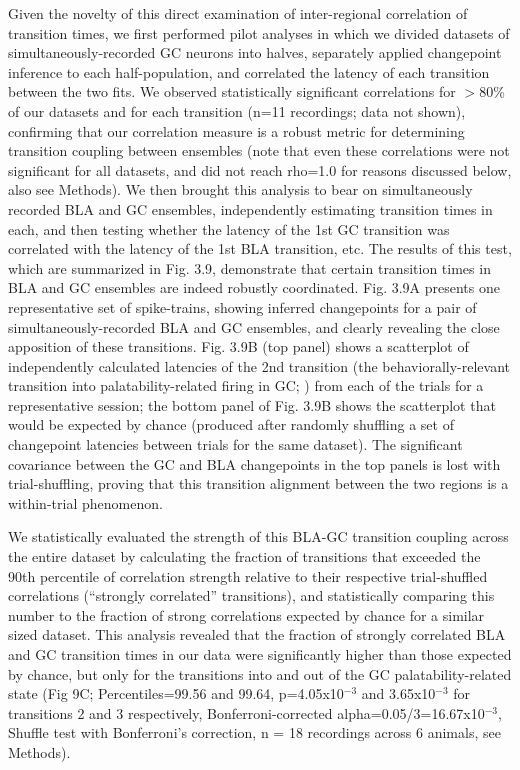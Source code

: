 \begin{refsection}
Given the novelty of this direct examination of inter-regional correlation of transition times, we first performed pilot analyses in which we divided datasets of simultaneously-recorded GC neurons into halves, separately applied changepoint inference to each half-population, and correlated the latency of each transition between the two fits. We observed statistically significant correlations for \(>\)80\% of our datasets and for each transition (n=11 recordings; data not shown), confirming that our correlation measure is a robust metric for determining transition coupling between ensembles (note that even these correlations were not significant for all datasets, and did not reach rho=1.0 for reasons discussed below, also see Methods). 
We then brought this analysis to bear on simultaneously recorded BLA and GC ensembles, independently estimating transition times in each, and then testing whether the latency of the 1st GC transition was correlated with the latency of the 1st BLA transition, etc. The results of this test, which are summarized in Fig. 3.9, demonstrate that certain transition times in BLA and GC ensembles are indeed robustly coordinated. Fig. 3.9A presents one representative set of spike-trains, showing inferred changepoints for a pair of simultaneously-recorded BLA and GC ensembles, and clearly revealing the close apposition of these transitions. Fig. 3.9B (top panel) shows a scatterplot of independently calculated latencies of the 2nd transition (the behaviorally-relevant transition into palatability-related firing in GC; \cite{sadacca2016a,mukherjee2019a}) from each of the trials for a representative session; the bottom panel of Fig. 3.9B shows the scatterplot that would be expected by chance (produced after randomly shuffling a set of changepoint latencies between trials for the same dataset). The significant covariance between the GC and BLA changepoints in the top panels is lost with trial-shuffling, proving that this transition alignment between the two regions is a within-trial phenomenon.

We statistically evaluated the strength of this BLA-GC transition coupling across the entire dataset by calculating the fraction of transitions that exceeded the 90th percentile of correlation strength relative to their respective trial-shuffled correlations (“strongly correlated” transitions), and statistically comparing this number to the fraction of strong correlations expected by chance for a similar sized dataset. This analysis revealed that the fraction of strongly correlated BLA and GC transition times in our data were significantly higher than those expected by chance, but only for the transitions into and out of the GC palatability-related state (Fig 9C; Percentiles=99.56 and 99.64, p=4.05x10$^{-3}$ and 3.65x10$^{-3}$ for transitions 2 and 3 respectively, Bonferroni-corrected alpha=0.05/3=16.67x10$^{-3}$, Shuffle test with Bonferroni’s correction, n = 18 recordings across 6 animals, see Methods). 


\end{refsection}
